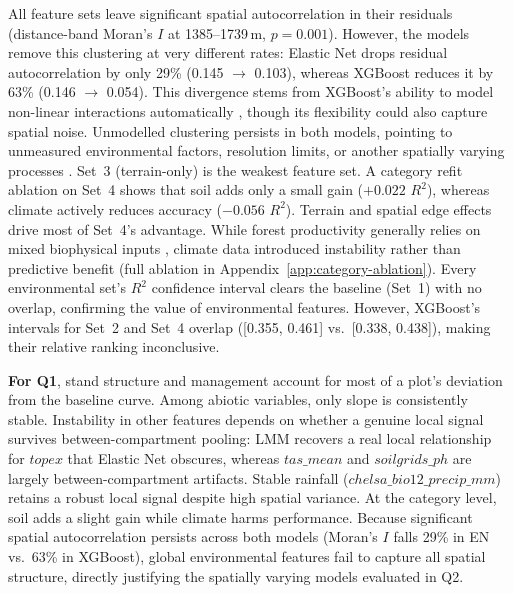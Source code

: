 \documentclass[logo,msc,ai]{infthesis}           %
\begin{document}
All feature sets leave significant spatial autocorrelation in their residuals (distance-band Moran's $I$ at 1385--1739\,m, $p = 0.001$). However, the models remove this clustering at very different rates: Elastic Net drops residual autocorrelation by only 29\% (0.145 $\to$ 0.103), whereas XGBoost reduces it by 63\% (0.146 $\to$ 0.054). This divergence stems from XGBoost's ability to model non-linear interactions automatically \citep{zou2005Regularization_C4_NN}, though its flexibility could also capture spatial noise. Unmodelled clustering persists in both models, pointing to unmeasured environmental factors, resolution limits, or another spatially varying processes \citep{gaspard2019Residual_C5_EVAL}. Set~3 (terrain-only) is the weakest feature set. A category refit ablation on Set~4 shows that soil adds only a small gain ($+0.022$ $R^2$), whereas climate actively reduces accuracy ($-0.056$ $R^2$). Terrain and spatial edge effects drive most of Set~4's advantage. While forest productivity generally relies on mixed biophysical inputs \citep{bontemps2014Predictive_C2_BG}, climate data introduced instability rather than predictive benefit (full ablation in Appendix~\ref{app:category-ablation}). Every environmental set's $R^2$ confidence interval clears the baseline (Set~1) with no overlap, confirming the value of environmental features. However, XGBoost's intervals for Set~2 and Set~4 overlap ([0.355, 0.461] vs.\ [0.338, 0.438]), making their relative ranking inconclusive.

\textbf{For Q1}, stand structure and management account for most of a plot's deviation from the baseline curve. Among abiotic variables, only slope is consistently stable. Instability in other features depends on whether a genuine local signal survives between-compartment pooling: LMM recovers a real local relationship for $\mathit{topex}$ that Elastic Net obscures, whereas $\mathit{tas\_mean}$ and $\mathit{soilgrids\_ph}$ are largely between-compartment artifacts. Stable rainfall ($\mathit{chelsa\_bio12\_precip\_mm}$) retains a robust local signal despite high spatial variance. At the category level, soil adds a slight gain while climate harms performance. Because significant spatial autocorrelation persists across both models (Moran's $I$ falls 29\% in EN vs.\ 63\% in XGBoost), global environmental features fail to capture all spatial structure, directly justifying the spatially varying models evaluated in Q2.
\end{document}
